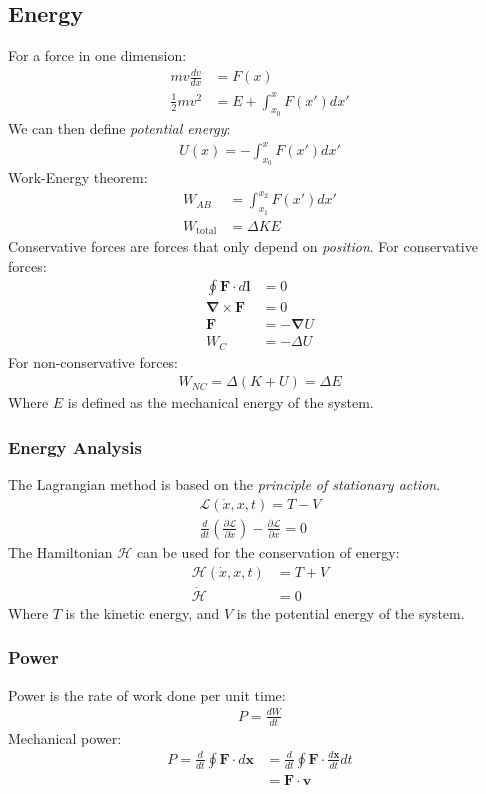 \documentclass[11pt]{article}
\newcommand{\Lagr}{\mathcal{L}}					%
\newcommand{\Hami}{\mathcal{H}}					%
\newcommand{\ve}[1]{\ensuremath{\bm{#1}}}			%
\begin{document}
\begin{multicols*}{3}
\subsection{Energy}
For a force in one dimension:
	\begin{align*}
	mv\frac{dv}{dx} &= F(x) \\
	\frac{1}{2}mv^2 &= E + \int_{x_0}^{x} F(x') dx'
	\end{align*}
We can then define \emph{potential energy}: 
	\begin{align*}
	U(x) = - \int_{x_0}^x F(x') dx' 
	\end{align*}
Work-Energy theorem:
	\begin{align*}
	W_{AB} &= \int_{x_1}^{x_2} F(x') dx' \\
	W_{\text{total}} &= \Delta KE
	\end{align*}
Conservative forces are forces that only depend on {\em position}. For conservative forces:
	\begin{align*}
	\oint \ve{F} \cdot d\ve{l} &= 0 \\
	\ve{\nabla} \times \ve{F} &= 0 \\
	\ve{F} &= - \ve{\nabla} U \\
	W_{C} &= -\Delta U
	\end{align*}
For non-conservative forces:
	\begin{align*}
	W_{NC} = \Delta(K+U) = \Delta E
	\end{align*}
Where $E$ is defined as the mechanical energy of the system.
\subsubsection{Energy Analysis}
The Lagrangian method is based on the \emph{principle of stationary action}.
	\begin{align*}
	\Lagr(\dot{x},x,t) = T - V \\
	\frac{d}{dt}(\frac{\partial \Lagr}{\partial \dot{x}}) - \frac{\partial \Lagr}{\partial x} = 0
	\end{align*}
The Hamiltonian $\Hami$ can be used for the conservation of energy:
	\begin{align*}
	\Hami(\dot{x},x,t) &= T + V \\
	\dot{\Hami}&=0
	\end{align*}
Where $T$ is the kinetic energy, and $V$ is the potential energy of the system.
\subsubsection{Power}
Power is the rate of work done per unit time:
	\begin{align*}
	P=\frac{dW}{dt}
	\end{align*}
Mechanical power:
	\begin{align*}
	P=\frac{d}{dt}\oint \ve{F} \cdot d\ve{x}&=\frac{d}{dt}\oint \ve{F} \cdot \frac{d\ve{x}}{dt} dt\\
	&=\ve{F} \cdot \ve{v}
	\end{align*}

\end{multicols*}
\end{document}
